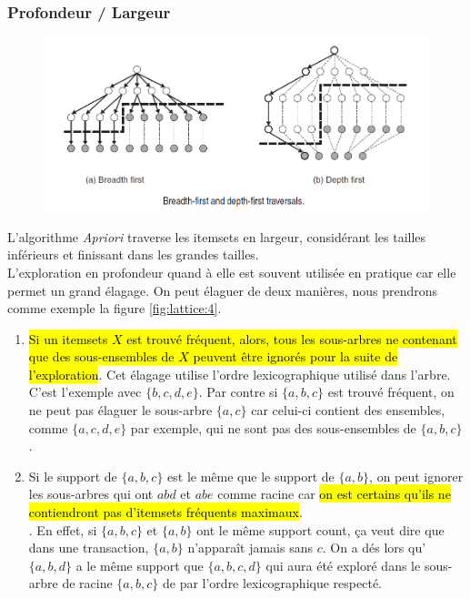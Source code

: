 \documentclass[letterpaper, 12pt]{article}
\newcommand{\alinea}{
\hspace*{0.5cm}}
\newcommand{\myul}[1]{
		\underline{\smash{#1}}
	}
\begin{document}
			\subsubsection{Profondeur / Largeur}
				\begin{figure}[H]
					\centering
					\includegraphics[scale=0.65]{Images/lattice_3}
					\caption{}
					\label{fig:lattice:3}
				\end{figure}\noindent
				\alinea L'algorithme \textit{Apriori} traverse les 
					itemsets en largeur, considérant les tailles
					inférieurs et finissant dans les grandes tailles.\\
				\alinea L'exploration en profondeur quand à elle est souvent
					utilisée en pratique car elle permet un grand élagage. 
					On peut élaguer de deux 
					manières, nous prendrons comme exemple la figure 
					\ref{fig:lattice:4}.
				\begin{enumerate}
					\setlength{\itemsep}{0pt}
					\setlength{\parskip}{0pt}
					\setlength{\parsep}{0pt}
					\item \hl{Si un itemsets $X$ est trouvé fréquent, alors,
						tous les sous-arbres ne contenant que des 
						sous-ensembles de $X$ peuvent être ignorés pour 
						la suite de l'exploration}. Cet élagage utilise
						l'ordre lexicographique utilisé dans l'arbre.
						C'est l'exemple avec $\{b, c, d, e\}$. Par contre
						si $\{a, b, c\}$ est trouvé fréquent, on ne peut
						pas élaguer le sous-arbre $\{a, c\}$ car celui-ci
						contient des ensembles, comme $\{a, c, d, e\}$ 
						par exemple, qui ne sont pas des sous-ensembles de
						$\{a, b, c\}$.
					\item Si le support de $\{a, b, c\}$ est le même 
						que le support de $\{a, b\}$, on peut ignorer
						les sous-arbres qui ont $abd$ et $abe$ comme
						racine car \hl{on est certains qu'ils ne contiendront 
						pas d'itemsets fréquents maximaux}.\\
						\myul{\textbf{\hl{On peut le prouver}}}. En effet,
						si $\{a, b, c\}$ et $\{a, b\}$ ont le même support 
						count, ça veut dire que dans une transaction,
						$\{a, b\}$ n'apparaît jamais sans $c$. On a dés lors
						qu'$\{a, b, d\}$ a le même support que 
						$\{a, b, c, d\}$ qui aura été exploré dans le 
						sous-arbre de racine $\{a, b, c\}$ de par l'ordre 
						lexicographique respecté.
				\end{enumerate}
				
\end{document}
